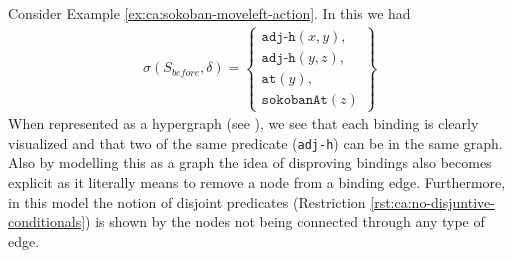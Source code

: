 \documentclass[../Master.tex]{subfiles}
\begin{document}
\begin{example}\label{ex:ca:sokoban-hypergraph}
	Consider Example \ref{ex:ca:sokoban-moveleft-action}. In this we had
	\begin{align*}
		\sigma(S_{before}, \delta) =
			\left\{
			\begin{gathered}
				\texttt{adj-h}(x, y), \\
				\texttt{adj-h}(y, z), \\
				\texttt{at}(y), \\
				\texttt{sokobanAt}(z)
			\end{gathered}
			\right\}
	\end{align*}
	When represented as a hypergraph (see ),
	we see that each binding is clearly visualized and that two of the same predicate (\texttt{adj-h}) can be in the same graph.
	Also by modelling this as a graph the idea of disproving bindings also
	becomes explicit as it literally means to remove a node from a binding edge.
	Furthermore, in this model the notion of disjoint predicates (Restriction \ref{rst:ca:no-disjuntive-conditionals}) is shown by the nodes not being connected through any type of edge.
\end{example}
\end{document}
